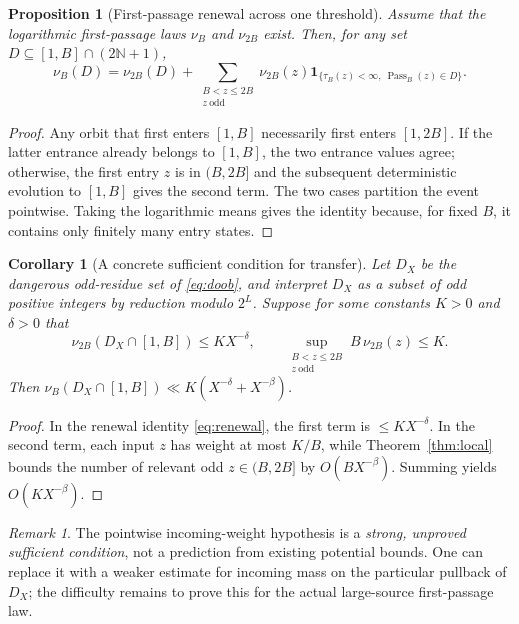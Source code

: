 \documentclass[11pt]{amsart}
\newtheorem{corollary}{Corollary}
\newtheorem{proposition}{Proposition}
\theoremstyle{remark}\newtheorem{remark}{Remark}
\newcommand{\N}{\mathbb N}
\newcommand{\Pass}{\operatorname{Pass}}
\begin{document}
\begin{proposition}[First-passage renewal across one threshold]\label{prop:renewal}
Assume that the logarithmic first-passage laws $\nu_B$ and $\nu_{2B}$ exist. Then, for any set $D\subseteq[1,B]\cap(2\N+1)$,
\begin{equation}\label{eq:renewal}
 \boxed{\nu_B(D)=\nu_{2B}(D)+
 \sum_{\substack{B<z\le2B\\z\ \mathrm{odd}}}\nu_{2B}(z)
 \mathbf1_{\{\tau_B(z)<\infty,\ \Pass_B(z)\in D\}}.}
\end{equation}
\end{proposition}
\begin{proof}
Any orbit that first enters $[1,B]$ necessarily first enters $[1,2B]$.  If the latter entrance already belongs to $[1,B]$, the two entrance values agree; otherwise, the first entry $z$ is in $(B,2B]$ and the subsequent deterministic evolution to $[1,B]$ gives the second term.  The two cases partition the event pointwise. Taking the logarithmic means gives the identity because, for fixed $B$, it contains only finitely many entry states.
\end{proof}
\begin{corollary}[A concrete sufficient condition for transfer]\label{cor:transfer}
Let $D_X$ be the dangerous odd-residue set of \eqref{eq:doob}, and interpret $D_X$ as a subset of odd positive integers by reduction modulo $2^L$. Suppose for some constants $K>0$ and $\delta>0$ that
\[
  \nu_{2B}(D_X\cap[1,B])\le KX^{-\delta},
 \qquad \sup_{\substack{B<z\le2B\\z\ \mathrm{odd}}} B\,\nu_{2B}(z)\le K.
\]
Then $\nu_B(D_X\cap[1,B])\ll K(X^{-\delta}+X^{-\beta})$.
\end{corollary}
\begin{proof}
In the renewal identity \eqref{eq:renewal}, the first term is $\le KX^{-\delta}$.  In the second term, each input $z$ has weight at most $K/B$, while Theorem~\ref{thm:local} bounds the number of relevant odd $z\in(B,2B]$ by $O(BX^{-\beta})$.  Summing yields $O(KX^{-\beta})$.
\end{proof}
\begin{remark}
The pointwise incoming-weight hypothesis is a \emph{strong, unproved sufficient condition}, not a prediction from existing potential bounds.  One can replace it with a weaker estimate for incoming mass on the particular pullback of $D_X$; the difficulty remains to prove this for the actual large-source first-passage law.
\end{remark}
\end{document}
